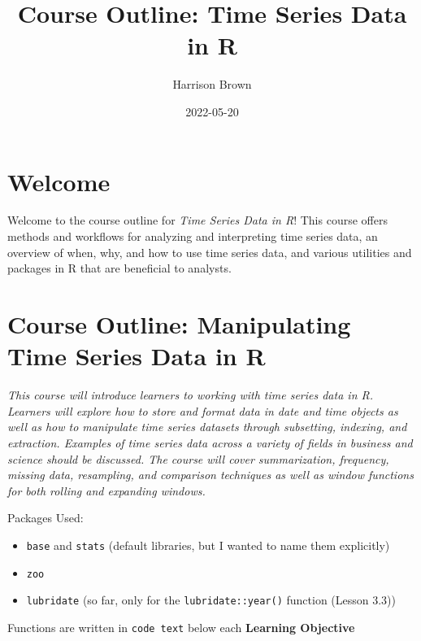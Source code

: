 \documentclass[
]{book}
\title{Course Outline: Time Series Data in R}
\author{Harrison Brown}
\date{2022-05-20}
\providecommand{\tightlist}{%
  \setlength{\itemsep}{0pt}\setlength{\parskip}{0pt}}
\begin{document}
\maketitle

{
\setcounter{tocdepth}{1}
\tableofcontents
}
\hypertarget{welcome}{%
\chapter*{Welcome}\label{welcome}}

Welcome to the course outline for \emph{Time Series Data in R}! This course offers methods and workflows for analyzing and interpreting time series data, an overview of when, why, and how to use time series data, and various utilities and packages in R that are beneficial to analysts.

\hypertarget{course-outline-manipulating-time-series-data-in-r}{%
\chapter*{Course Outline: Manipulating Time Series Data in R}\label{course-outline-manipulating-time-series-data-in-r}}

\emph{This course will introduce learners to working with time series data in R. Learners will explore how to store and format data in date and time objects as well as how to manipulate time series datasets through subsetting, indexing, and extraction. Examples of time series data across a variety of fields in business and science should be discussed. The course will cover summarization, frequency, missing data, resampling, and comparison techniques as well as window functions for both rolling and expanding windows.}

Packages Used:

\begin{itemize}
\tightlist
\item
  \texttt{base} and \texttt{stats} (default libraries, but I wanted to name them explicitly)
\item
  \texttt{zoo}
\item
  \texttt{lubridate} (so far, only for the \texttt{lubridate::year()} function (Lesson 3.3))
\end{itemize}

Functions are written in \texttt{code\ text} below each \textbf{Learning Objective}
\end{document}
